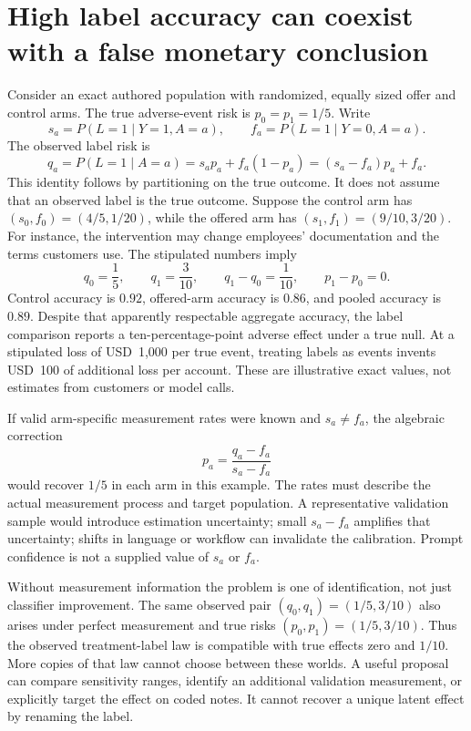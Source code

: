 \section{High label accuracy can coexist with a false monetary conclusion}

Consider an exact authored population with randomized, equally sized offer
and control arms. The true adverse-event risk is \(p_0=p_1=1/5\). Write
\[
 s_a=P(L=1\mid Y=1,A=a),\qquad
 f_a=P(L=1\mid Y=0,A=a).
\]
The observed label risk is
\[
 q_a=P(L=1\mid A=a)=s_ap_a+f_a(1-p_a)
     =(s_a-f_a)p_a+f_a.
\]
This identity follows by partitioning on the true outcome. It does not
assume that an observed label is the true outcome. Suppose the control arm has
\((s_0,f_0)=(4/5,1/20)\), while the offered arm has
\((s_1,f_1)=(9/10,3/20)\). For instance, the intervention may change employees'
documentation and the terms customers use. The stipulated numbers imply
\[
 q_0=\frac15,\qquad q_1=\frac3{10},\qquad q_1-q_0=\frac1{10},
 \qquad p_1-p_0=0.
\]
Control accuracy is \(0.92\), offered-arm accuracy is \(0.86\), and pooled
accuracy is \(0.89\). Despite that apparently respectable aggregate accuracy,
the label comparison reports a ten-percentage-point adverse effect under a
true null. At a stipulated loss of USD~1,000 per true event, treating labels
as events invents USD~100 of additional loss per account. These are
illustrative exact values, not estimates from customers or model
calls.~\citep{exec17_ontology_oracle}

If valid arm-specific measurement rates were known and \(s_a\ne f_a\), the
algebraic correction
\[
 p_a=\frac{q_a-f_a}{s_a-f_a}
\]
would recover \(1/5\) in each arm in this example. The rates must describe the
actual measurement process and target population. A representative validation
sample would introduce estimation uncertainty; small \(s_a-f_a\) amplifies
that uncertainty; shifts in language or workflow can invalidate the
calibration. Prompt confidence is not a supplied value of \(s_a\) or \(f_a\).

Without measurement information the problem is one of identification, not
just classifier improvement. The same observed pair
\((q_0,q_1)=(1/5,3/10)\) also arises under perfect measurement and true risks
\((p_0,p_1)=(1/5,3/10)\). Thus the observed treatment-label law is compatible
with true effects zero and \(1/10\). More copies of that law cannot choose
between these worlds. A useful proposal can compare sensitivity ranges,
identify an additional validation measurement, or explicitly target the
effect on coded notes. It cannot recover a unique latent effect by renaming
the label.


